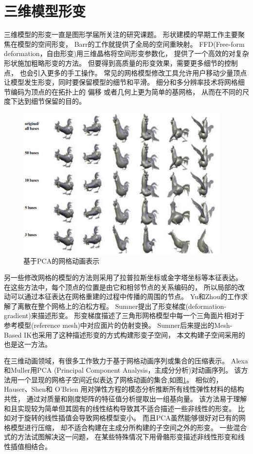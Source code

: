 \section{三维模型形变}
三维模型的形变一直是图形学届所关注的研究课题。
形状建模的早期工作主要聚焦在模型的空间形变，
Barr的工作\cite{barr1984global}就提供了全局的空间重映射。
FFD(Free-form deformation，自由形变)\cite{sederberg1986free}用三维晶格将空间形变参数化，
提供了一个高效的对复杂形状施加粗略形变的方法。
但要得到高质量的形变效果，需要更多细节的控制点\cite{coquillart1990extended}，
也会引入更多的手工操作。
常见的网格模型修改工具允许用户移动少量顶点让模型发生形变，同时要保留模型的细节和平滑。
细分和多分辨率技术将网格细节编码为顶点的在拓扑上的
偏移\cite{zorin1997interactive}\cite{kobbelt2000multiresolution}
或者几何上更为简单的基网格\cite{kobbelt1998interactive}，
从而在不同的尺度下达到细节保留的目的。
\begin{figure}[h]
    \centering
    \includegraphics[width=0.95\textwidth]{./Pictures/PCA.eps}
    \caption{基于PCA的网格动画表示}
    \label{pca}
\end{figure}

另一些修改网格的模型的方法则采用了拉普拉斯坐标或金字塔坐标等本征表达。
在这些方法中，每个顶点的位置是由它和相邻节点的关系编码的，
所以局部的改动可以通过本征表达在网格重建的过程中传播的周围的节点。
Yu和Zhou的工作\cite{yu2004mesh}求解了离散在整个网格上的泊松方程。
Sumner提出了形变梯度(deformation-gradient)\cite{sumner2004deformation}来描述形变。
形变梯度描述了三角形网格模型中每一个三角面片相对于参考模型(reference mesh)中对应面片的仿射变换。
Sumner后来提出的Mesh-Based IK\cite{sumner2005mesh}也采用了这种描述形变的方式构建形变子空间，
本文构建子空间采用的也是这一方法。

在三维动画领域，有很多工作致力于基于网格动画序列或集合的压缩表示。
Alexa和Muller\cite{alexa2000representing}用PCA
(Principal Component Analysis，主成分分析)对动画序列。
该方法用一个显现的网格子空间近似表达了网格动画的集合,如图\ref{pca}。
相似的，Hauser、Shen和 O’Brien\cite{hauser2003interactive}
用对弹性方程的模态分析推断所有线性弹性材料的结构共性，
通过对质量和刚度矩阵的特征值分析提取出一组基向量。
该方法易于理解和且实现较为简单但其固有的线性结构导致其不适合描述一些非线性的形变。
比如对于旋转的线性插值会导致网格模型变小。
而且PCA虽然能够很好对已有的网格模型进行压缩，
却不适合构建在主成分所构建的子空间之外的形变。
一些混合式的方法试图解决这一问题，
在某些特殊情况下用骨骼形变描述非线性形变和线性插值相结合\cite{lewis2000pose}。